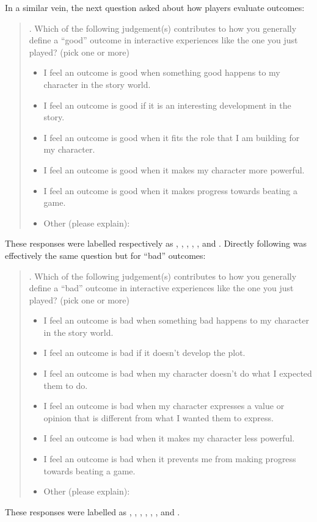 In a similar vein, the next question asked about how players evaluate outcomes:
%
\begin{quote}
  . Which of the following judgement(s) contributes to how you generally define a ``good'' outcome in interactive experiences like the one you just played? (pick one or more) \\
  \begin{itemize}
    \item[\ding{111}] I feel an outcome is good when something good happens to my character in the story world.
    \item[\ding{111}] I feel an outcome is good if it is an interesting development in the story.
    \item[\ding{111}] I feel an outcome is good when it fits the role that I am building for my character.
    \item[\ding{111}] I feel an outcome is good when it makes my character more powerful.
    \item[\ding{111}] I feel an outcome is good when it makes progress towards beating a game.
    \item[\ding{111}] Other (please explain):
  \end{itemize}
\end{quote}
%
These responses were labelled respectively as , , , , , and .
%
Directly following was effectively the same question but for ``bad'' outcomes:
%
\begin{quote}
  . Which of the following judgement(s) contributes to how you generally define a ``bad'' outcome in interactive experiences like the one you just played? (pick one or more)
  \begin{itemize}
    \item[\ding{111}] I feel an outcome is bad when something bad happens to my character in the story world.
    \item[\ding{111}] I feel an outcome is bad if it doesn't develop the plot.
    \item[\ding{111}] I feel an outcome is bad when my character doesn't do what I expected them to do.
    \item[\ding{111}] I feel an outcome is bad when my character expresses a value or opinion that is different from what I wanted them to express.
    \item[\ding{111}] I feel an outcome is bad when it makes my character less powerful.
    \item[\ding{111}] I feel an outcome is bad when it prevents me from making progress towards beating a game.
    \item[\ding{111}] Other (please explain):
  \end{itemize}
\end{quote}
%
These responses were labelled as , , , , , , and .

